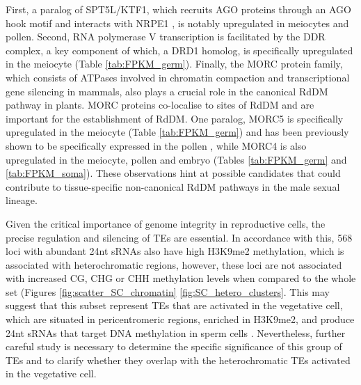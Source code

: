  First, a paralog of SPT5L/KTF1, which recruits AGO proteins through an AGO hook motif \citep{RN121,RN273}  and interacts with NRPE1 \citep{RN271,RN272}, is notably upregulated in meiocytes and pollen. Second, RNA polymerase V transcription is facilitated by the DDR complex, a key component of which, a DRD1 homolog, is specifically upregulated in the meiocyte (Table \ref{tab:FPKM_germ}). Finally, the MORC protein family, which consists of ATPases involved in chromatin compaction and transcriptional gene silencing in mammals, also plays a crucial role in the canonical RdDM pathway in plants. MORC proteins co-localise to sites of RdDM and are important for the establishment of RdDM. One paralog, MORC5 is specifically upregulated in the meiocyte (Table \ref{tab:FPKM_germ}) and has been previously shown to be specifically expressed in the pollen \citep{RN274}, while MORC4 is also upregulated in the meiocyte, pollen and embryo (Tables \ref{tab:FPKM_germ} and \ref{tab:FPKM_soma}). These observations hint at possible candidates that could contribute to tissue-specific non-canonical RdDM pathways in the male sexual lineage.

Given the critical importance of genome integrity in reproductive cells, the precise regulation and silencing of TEs are essential. In accordance with this, 568 loci with abundant 24nt sRNAs also have high H3K9me2 methylation, which is associated with heterochromatic regions, however, these loci are not associated with increased CG, CHG or CHH methylation levels when compared to the whole set (Figures \ref{fig:scatter_SC_chromatin} \ref{fig:SC_hetero_clusters}. This may suggest that this subset represent TEs that are activated in the vegetative cell, which are situated in pericentromeric regions, enriched in H3K9me2, and produce 24nt sRNAs that target DNA methylation in sperm cells \citep{RN278}. Nevertheless, further careful study is necessary to determine the specific significance of this group of TEs and to clarify whether they overlap with the heterochromatic TEs activated in the vegetative cell.

